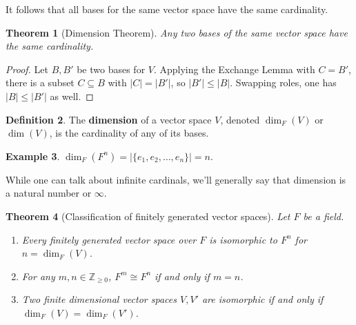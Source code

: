 \documentclass[12pt]{report}
\newtheorem{theorem}{Theorem}[chapter]
\numberwithin{equation}{section}
\numberwithin{theorem}{chapter}
\theoremstyle{definition}
\newtheorem{definition}[theorem]{Definition}
\newtheorem{example}[theorem]{Example}
\newtheorem*{basic properties}{Basic Properties}
\newtheorem*{Important Remark}{Important Remark}
\newcommand{\df}[1]{{\bf #1}\index{#1}}
\begin{document}
It follows that all bases for the same vector space have the same cardinality.


\begin{theorem}[Dimension Theorem]
Any two bases of the same vector space have the same cardinality.
\end{theorem}


\begin{proof}
Let $B, B'$ be two bases for $V$. Applying the Exchange Lemma with $C=B'$, there is a subset $C\subseteq B$ with $|C|=|B'|$, so $|B'|\leq |B|$. Swapping roles, one has $|B| \leq |B'|$ as well.
\end{proof}



\begin{definition}
 The \df{dimension} of a vector space $V$, denoted $\dim_F(V)$ or $\dim(V)$, is the cardinality of any of its bases.
 \end{definition}
 

 \begin{example}
 $\dim_F(F^n) = |\{e_1,e_2,\ldots,e_n\}| = n.$
 \end{example}

 While one can talk about infinite cardinals, we'll generally say that dimension is a natural number or $\infty$.
 
 
\begin{theorem}[Classification of finitely generated vector spaces]
 Let $F$ be a field. 
\begin{enumerate}[label=(\arabic*),itemsep=0mm]
\item Every finitely generated vector space over $F$ is isomorphic to $F^n$ for $n=\dim_F(V)$. 
\item For any $m,n \in \mathbb{Z}_{\geqslant 0}$,  $F^m \cong F^n$ if and only if $m = n$.
\item Two finite dimensional vector spaces $V,V'$ are isomorphic if and only if $\dim_F(V)=\dim_F(V')$.
\end{enumerate}
\end{theorem}
\end{document}
